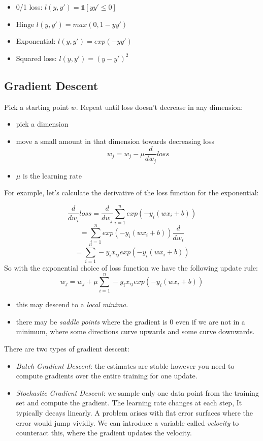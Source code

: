 \documentclass{article}
\begin{document}
\begin{itemize}
\tightlist
\item
  0/1 loss: \(l(y, y')=\mathbb{1}[yy' \le 0]\)
\item
  Hinge \(l(y, y')= max(0,1-yy')\)
\item
  Exponential: \(l(y, y') = exp(-yy')\)
\item
  Squared loss: \(l(y, y') = (y -y')^2\)
\end{itemize}

\subsection{Gradient Descent}\label{gradient-descent-1}

Pick a starting point \(w\). Repeat until loss doesn't decrease in any
dimension:

\begin{itemize}
\tightlist
\item
  pick a dimension
\item
  move a small amount in that dimension towards decreasing loss
  \[w_j = w_j - \mu \frac{d}{dw_j}loss\]
\item
  \(\mu\) is the learning rate
\end{itemize}

For example, let's calculate the derivative of the loss function for the
exponential:

\[\frac{d}{dw_i} loss = \frac{d}{dw_j} \sum_{i=1}^{n}exp(-y_i(wx_i+b))\]
\[ = \sum_{i=1}^{n}exp(-y_i(wx_i+b))\frac{d}{dw_i}\]
\[= \sum_{i=1}^n -y_ix_{ij}exp(-y_i(wx_i+b))\] So with the exponential
choice of loss function we have the following update rule:
\[w_j = w_j + \mu \sum_{i=1}^n -y_ix_{ij}exp(-y_i(wx_i+b))\]

\begin{itemize}
\tightlist
\item
  this may descend to a \emph{local minima}.
\item
  there may be \emph{saddle points} where the gradient is 0 even if we
  are not in a minimum, where some directions curve upwards and some
  curve downwards.
\end{itemize}

There are two types of gradient descent:

\begin{itemize}
\tightlist
\item
  \emph{Batch Gradient Descent}: the estimates are stable however you
  need to compute gradients over the entire training for one update.
\item
  \emph{Stochastic Gradient Descent}: we sample only one data point from
  the training set and compute the gradient. The learning rate changes
  at each step, It typically decays linearly. A problem arises with flat
  error surfaces where the error would jump vividly. We can introduce a
  variable called \emph{velocity} to counteract this, where the gradient
  updates the velocity.
\end{itemize}
\end{document}
